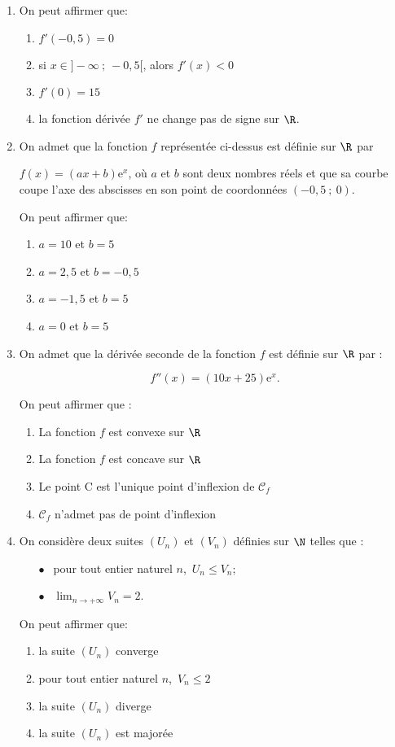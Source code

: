\begin{enumerate}
\item On peut affirmer que:
	\begin{enumerate}
		\item $f'(-0,5) = 0$
		\item si $x \in ]- \infty~;~-0,5[$, alors $f'(x) < 0$
		\item $f'(0) = 15$
		\item la fonction dérivée $f'$ ne change pas de
signe sur $\R$.
	\end{enumerate}
\item On admet que la fonction $f$ représentée ci-dessus est définie sur $\R$ par 

$f(x) = (ax + b)\text{e}^x$, où $a$ et $b$ sont deux nombres réels et que sa courbe coupe l'axe des abscisses en son point de coordonnées $(-0,5~;~ 0)$.

On peut affirmer que:
	\begin{enumerate}
		\item $a = 10$ et $b = 5$
		\item $a = 2,5$ et $b = -0,5$
		\item $a = -1,5$ et $b = 5$
		\item $a = 0$ et $b = 5$
	\end{enumerate}
\item On admet que la dérivée seconde de la fonction $f$ est définie sur $\R$ par : 

\[f''(x) = (10x + 25)\text{e}^x.\]

On peut affirmer que :
	\begin{enumerate}
		\item La fonction $f$ est convexe sur $\R$
		\item La fonction $f$ est concave sur $\R$
		\item Le point C est l'unique point d'inflexion de $\mathcal{C}_f$
		\item $\mathcal{C}_f$ n'admet pas de point d'inflexion
	\end{enumerate}
\item On considère deux suites $\left(U_n\right)$ et  $\left(V_n\right)$ définies sur $\N$ telles que : 

\setlength\parindent{1cm}
\begin{itemize}
\item[$\bullet~~$] pour tout entier naturel $n$,\, $U_n \leqslant V_n$;
\item[$\bullet~~$] $\displaystyle\lim_{n \to+ \infty}  V_n= 2$.
\end{itemize}
\setlength\parindent{0cm}

On peut affirmer que:

	\begin{enumerate}
		\item la suite $\left(U_n\right)$ converge 
		\item pour tout entier naturel $n$,\, $V_n \leqslant 2$		
		\item la suite $\left(U_n\right)$ diverge
		\item la suite $\left(U_n\right)$ est majorée
	\end{enumerate} 
\end{enumerate}

\bigskip

